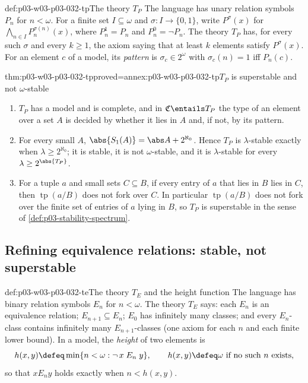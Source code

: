 \begin{hbdefinition}{def:p03-w03-p03-032-tp}{The theory \(T_P\)}
The language has unary relation symbols \(P_n\) for \(n<\omega\).  For a
finite set \(I\subseteq\omega\) and \(\sigma:I\to\{0,1\}\), write
\(P^\sigma(x)\) for \(\bigwedge_{n\in I}P_n^{\sigma(n)}(x)\), where
\(P_n^1=P_n\) and \(P_n^0=\neg P_n\).  The theory \(T_P\) has, for every such
\(\sigma\) and every \(k\geq1\), the axiom saying that at least \(k\)
elements satisfy \(P^\sigma(x)\).  For an element \(c\) of a model, its
\emph{pattern} is \(\sigma_c\in2^\omega\) with \(\sigma_c(n)=1\) iff
\(P_n(c)\).
\end{hbdefinition}

\begin{hbtheorem}{thm:p03-w03-p03-032-tp}{proved=annex:p03-w03-p03-032-tp}{\(T_P\) is superstable and not \(\omega\)-stable}
\begin{enumerate}
  \item \(T_P\) has a model and is complete, and in \(\mathfrak C\entails T_P\)
        the type of an element over a set \(A\) is decided by whether it lies
        in \(A\) and, if not, by its pattern.
  \item For every small \(A\),
        \(\abs{S_1(A)}=\abs A+2^{\aleph_0}\).  Hence \(T_P\) is
        \(\lambda\)-stable exactly when \(\lambda\geq2^{\aleph_0}\); it is
        stable, it is not \(\omega\)-stable, and it is \(\lambda\)-stable for
        every \(\lambda\geq2^{\abs{T_P}}\).
  \item For a tuple \(a\) and small sets \(C\subseteq B\), if every entry of
        \(a\) that lies in \(B\) lies in \(C\), then
        \(\operatorname{tp}(a/B)\) does not fork over \(C\).  In particular
        \(\operatorname{tp}(a/B)\) does not fork over the finite set of
        entries of \(a\) lying in \(B\), so \(T_P\) is superstable in the
        sense of \cref{def:p03-stability-spectrum}.
\end{enumerate}
\end{hbtheorem}

\subsection{Refining equivalence relations: stable, not superstable}

\begin{hbdefinition}{def:p03-w03-p03-032-te}{The theory \(T_E\) and the height function}
The language has binary relation symbols \(E_n\) for \(n<\omega\).  The
theory \(T_E\) says: each \(E_n\) is an equivalence relation;
\(E_{n+1}\subseteq E_n\); \(E_0\) has infinitely many classes; and every
\(E_n\)-class contains infinitely many \(E_{n+1}\)-classes (one axiom for
each \(n\) and each finite lower bound).  In a model, the \emph{height} of
two elements is
\[
  h(x,y)\defeq\min\{n<\omega:\neg\,x\mathrel{E_n}y\},
  \qquad h(x,y)\defeq\omega\text{ if no such }n\text{ exists},
\]
so that \(x\mathrel{E_n}y\) holds exactly when \(n<h(x,y)\).
\end{hbdefinition}

